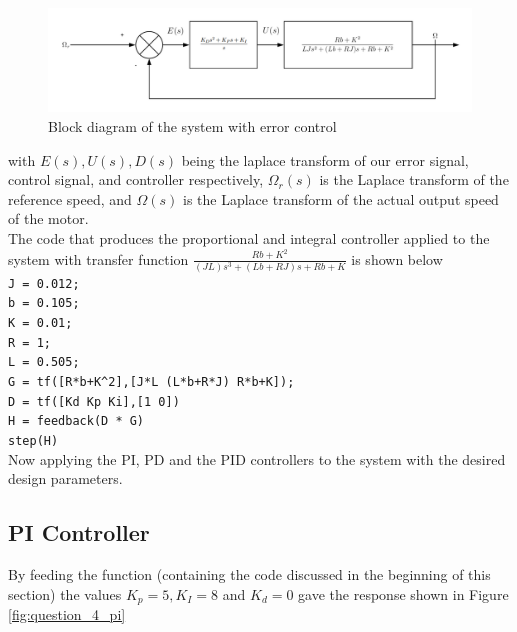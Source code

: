 \documentclass[a4paper, 12pt]{article}
\begin{document}
\begin{figure}[H]
  \centering
  \includegraphics[width=\textwidth]{Images/Block_Diagram_Question_4.png}
  \caption{Block diagram of the system with error control}
  \label{fig:block_diagram_question_4}
\end{figure}

with $E(s), U(s), D(s)$ being the laplace transform of our error signal,
control signal, and controller respectively, $\Omega_r(s)$ is the Laplace
transform of the reference speed, and $\Omega(s)$ is the Laplace transform of
the actual output speed of the motor.
\\

The code that produces the proportional and integral controller applied to the
system with transfer function $\frac{Rb+K^2}{(JL)s^3+(Lb+RJ)s+Rb+K}$ is shown
below \\ 

\noindent
\texttt{J = 0.012;}\\
\texttt{b = 0.105;}\\
\texttt{K = 0.01;}\\
\texttt{R = 1;}\\
\texttt{L = 0.505;}\\
\texttt{G = tf([R*b+K\^{}2],[J*L (L*b+R*J) R*b+K]);}\\
\texttt{D = tf([Kd Kp Ki],[1 0])}\\
\texttt{H = feedback(D * G)}\\
\texttt{step(H)}\\

Now applying the PI, PD and the PID controllers to the system with the desired design parameters.

\subsection{PI Controller} %
\label{sub:pi_controller}
By feeding the function (containing the code discussed in the beginning of this section) the values $K_p = 5, K_I = 8$ and $K_d = 0$ gave the response shown in Figure \ref{fig:question_4_pi}
\end{document}
